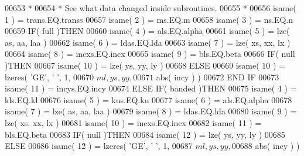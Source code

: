 \begin{DoxyCode}
00653 \textcolor{comment}{*}
00654 \textcolor{comment}{*                             See what data changed inside subroutines.}
00655 \textcolor{comment}{*}
00656                               isame( 1 ) = trans.EQ.transs
00657                               isame( 2 ) = ms.EQ.m
00658                               isame( 3 ) = ns.EQ.n
00659                               \textcolor{keywordflow}{IF}( full )\textcolor{keywordflow}{THEN}
00660                                  isame( 4 ) = als.EQ.alpha
00661                                  isame( 5 ) = lze( as, aa, laa )
00662                                  isame( 6 ) = ldas.EQ.lda
00663                                  isame( 7 ) = lze( xs, xx, lx )
00664                                  isame( 8 ) = incxs.EQ.incx
00665                                  isame( 9 ) = bls.EQ.beta
00666                                  \textcolor{keywordflow}{IF}( null )\textcolor{keywordflow}{THEN}
00667                                     isame( 10 ) = lze( ys, yy, ly )
00668                                  \textcolor{keywordflow}{ELSE}
00669                                     isame( 10 ) = lzeres( \textcolor{stringliteral}{'GE'}, \textcolor{stringliteral}{' '}, 1,
00670      $                                            ml, ys, yy,
00671      $                                            abs( incy ) )
00672 \textcolor{keywordflow}{                                 END IF}
00673                                  isame( 11 ) = incys.EQ.incy
00674                               \textcolor{keywordflow}{ELSE} \textcolor{keywordflow}{IF}( banded )\textcolor{keywordflow}{THEN}
00675                                  isame( 4 ) = kls.EQ.kl
00676                                  isame( 5 ) = kus.EQ.ku
00677                                  isame( 6 ) = als.EQ.alpha
00678                                  isame( 7 ) = lze( as, aa, laa )
00679                                  isame( 8 ) = ldas.EQ.lda
00680                                  isame( 9 ) = lze( xs, xx, lx )
00681                                  isame( 10 ) = incxs.EQ.incx
00682                                  isame( 11 ) = bls.EQ.beta
00683                                  \textcolor{keywordflow}{IF}( null )\textcolor{keywordflow}{THEN}
00684                                     isame( 12 ) = lze( ys, yy, ly )
00685                                  \textcolor{keywordflow}{ELSE}
00686                                     isame( 12 ) = lzeres( \textcolor{stringliteral}{'GE'}, \textcolor{stringliteral}{' '}, 1,
00687      $                                            ml, ys, yy,
00688      $                                            abs( incy ) )

\end{DoxyCode}
